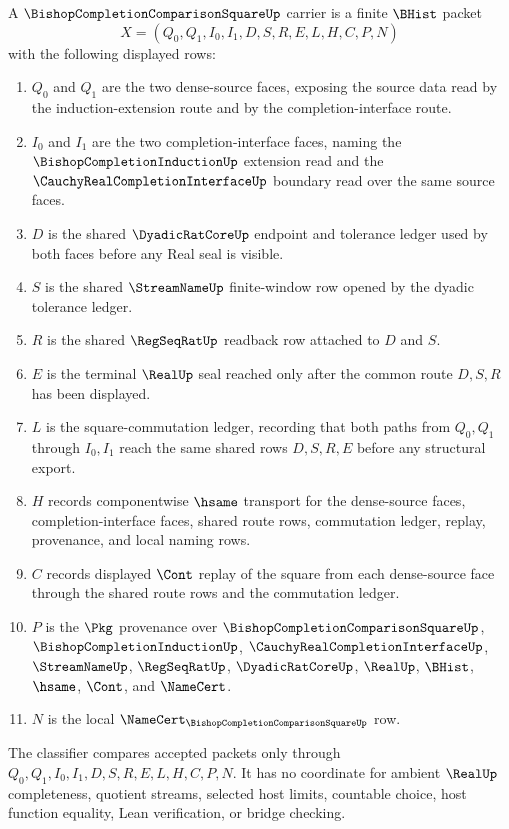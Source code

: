 \begin{definition}
\label{def:bishop-completion-comparison-square-carrier}
A $\BishopCompletionComparisonSquareUp$ carrier is a finite $\BHist$ packet
$$
X=(Q_0,Q_1,I_0,I_1,D,S,R,E,L,H,C,P,N)
$$
with the following displayed rows:
\begin{enumerate}
\item $Q_0$ and $Q_1$ are the two dense-source faces, exposing the source data read by the induction-extension route and by the completion-interface route.
\item $I_0$ and $I_1$ are the two completion-interface faces, naming the $\BishopCompletionInductionUp$ extension read and the $\CauchyRealCompletionInterfaceUp$ boundary read over the same source faces.
\item $D$ is the shared $\DyadicRatCoreUp$ endpoint and tolerance ledger used by both faces before any Real seal is visible.
\item $S$ is the shared $\StreamNameUp$ finite-window row opened by the dyadic tolerance ledger.
\item $R$ is the shared $\RegSeqRatUp$ readback row attached to $D$ and $S$.
\item $E$ is the terminal $\RealUp$ seal reached only after the common route $D,S,R$ has been displayed.
\item $L$ is the square-commutation ledger, recording that both paths from $Q_0,Q_1$ through $I_0,I_1$ reach the same shared rows $D,S,R,E$ before any structural export.
\item $H$ records componentwise $\hsame$ transport for the dense-source faces, completion-interface faces, shared route rows, commutation ledger, replay, provenance, and local naming rows.
\item $C$ records displayed $\Cont$ replay of the square from each dense-source face through the shared route rows and the commutation ledger.
\item $P$ is the $\Pkg$ provenance over $\BishopCompletionComparisonSquareUp$, $\BishopCompletionInductionUp$, $\CauchyRealCompletionInterfaceUp$, $\StreamNameUp$, $\RegSeqRatUp$, $\DyadicRatCoreUp$, $\RealUp$, $\BHist$, $\hsame$, $\Cont$, and $\NameCert$.
\item $N$ is the local $\NameCert_{\BishopCompletionComparisonSquareUp}$ row.
\end{enumerate}
The classifier compares accepted packets only through $Q_0,Q_1,I_0,I_1,D,S,R,E,L,H,C,P,N$. It has no coordinate for ambient $\RealUp$ completeness, quotient streams, selected host limits, countable choice, host function equality, Lean verification, or bridge checking.
\end{definition}

